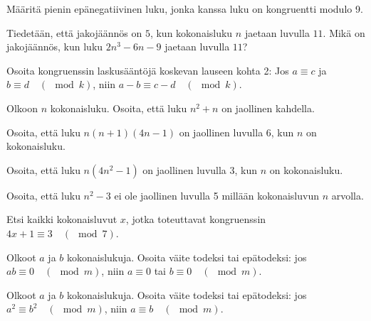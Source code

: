 \begin{kotitehtavasivu}
\begin{tehtava}
	Määritä pienin epänegatiivinen luku, jonka kanssa luku
	on kongruentti modulo 9.
\end{tehtava}

\begin{tehtava}
	Tiedetään, että jakojäännös on $5$, kun kokonaisluku $n$ jaetaan luvulla $11$. Mikä on jakojäännös, kun luku $2n^3 - 6n - 9$ jaetaan luvulla $11$?
\end{tehtava}

\begin{tehtava}
	Osoita kongruenssin laskusääntöjä koskevan lauseen kohta 2: Jos $a\equiv c$ ja $b\equiv d\quad (\mod k)$, niin $a-b\equiv c-d \quad(\mod k)$.
\end{tehtava}

\begin{tehtava}
	Olkoon $n$ kokonaisluku. Osoita, että luku $n^2 + n$ on jaollinen kahdella.
\end{tehtava}

\begin{tehtava}
	Osoita, että luku $n(n + 1)(4n - 1)$ on jaollinen luvulla 6, kun $n$ on kokonaisluku.
\end{tehtava}

\begin{tehtava}
	Osoita, että luku $n(4n^2 - 1)$ on jaollinen luvulla 3, kun $n$ on kokonaisluku.
\end{tehtava}

\begin{tehtava}
	Osoita, että luku $n^2 - 3$ ei ole jaollinen luvulla 5 millään kokonaisluvun $n$ arvolla.
\end{tehtava}

\begin{tehtava}
	Etsi kaikki kokonaisluvut $x$, jotka toteuttavat kongruenssin $4x+1\equiv 3\quad (\mod 7)$.
\end{tehtava}

\begin{tehtava}
	Olkoot $a$ ja $b$ kokonaislukuja. Osoita väite todeksi tai epätodeksi: jos $ab \equiv 0 \quad (\mod m)$, niin $a \equiv 0$ tai $b\equiv 0 \quad (\mod m)$.
\end{tehtava}

\begin{tehtava}
	Olkoot $a$ ja $b$ kokonaislukuja. Osoita väite todeksi tai epätodeksi: jos $a^2 \equiv b^2 \quad (\mod m)$, niin $a \equiv b \quad (\mod m)$.
\end{tehtava}


\end{kotitehtavasivu}
